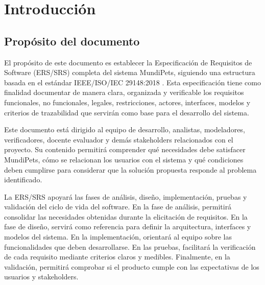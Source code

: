 \documentclass[journal,onecolumn]{IEEEtran}
\begin{document}
	\newpage
	\tableofcontents
	\newpage
	\listoffigures
	\listoftables
	\lstlistoflistings
	\newpage
	
	\section{Introducción}
	
	\subsection{Propósito del documento}
	\label{sec:proposito}
	
	El propósito de este documento es establecer la Especificación de Requisitos de
	Software (ERS/SRS) completa del sistema MundiPets, siguiendo una estructura
	basada en el estándar IEEE/ISO/IEC 29148:2018 \cite{iso29148}. Esta
	especificación tiene como finalidad documentar de manera clara, organizada y
	verificable los requisitos funcionales, no funcionales, legales, restricciones,
	actores, interfaces, modelos y criterios de trazabilidad que servirán como base
	para el desarrollo del sistema.
	
	Este documento está dirigido al equipo de desarrollo, analistas, modeladores,
	verificadores, docente evaluador y demás stakeholders relacionados con el
	proyecto. Su contenido permitirá comprender qué necesidades debe satisfacer
	MundiPets, cómo se relacionan los usuarios con el sistema y qué condiciones
	deben cumplirse para considerar que la solución propuesta responde al problema
	identificado.
	
	La ERS/SRS apoyará las fases de análisis, diseño, implementación, pruebas y
	validación del ciclo de vida del software. En la fase de análisis, permitirá
	consolidar las necesidades obtenidas durante la elicitación de requisitos. En
	la fase de diseño, servirá como referencia para definir la arquitectura,
	interfaces y modelos del sistema. En la implementación, orientará al equipo
	sobre las funcionalidades que deben desarrollarse. En las pruebas, facilitará
	la verificación de cada requisito mediante criterios claros y medibles.
	Finalmente, en la validación, permitirá comprobar si el producto cumple con
	las expectativas de los usuarios y stakeholders.
	
\end{document}
